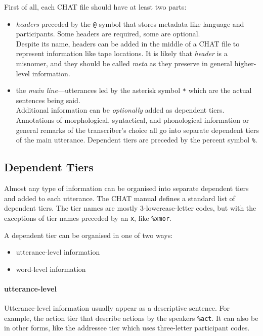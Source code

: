First of all, each CHAT file should have at least two parts:
\begin{itemize}
	\item \emph{headers} preceded by the \texttt{@} symbol that stores metadata like language and participants. Some headers are required, some are optional.\\
	Despite its name, headers can be added in the middle of a CHAT file to represent information like tape locations. It is likely that \emph{header} is a misnomer, and they should be called \emph{meta} as they preserve in general higher-level information.
	\item the \emph{main line}---utterances led by the asterisk symbol \texttt{*} which are the actual sentences being said.\\
	Additional information can be \emph{optionally} added as dependent tiers. Annotations of morphological, syntactical, and phonological information or general remarks of the transcriber's choice all go into separate dependent tiers of the main utterance. Dependent tiers are preceded by the percent symbol \texttt{\%}.
\end{itemize}

\subsection{Dependent Tiers}
Almost any type of information can be organised into separate dependent tiers and added to each utterance. The CHAT manual defines a standard list of dependent tiers. The tier names are mostly 3-lowercase-letter codes, but with the exceptions of tier names preceded by an \texttt{x}, like \texttt{\%xmor}.

A dependent tier can be organised in one of two ways:
\begin{itemize}
	\item utterance-level information
	\item word-level information
\end{itemize}

\paragraph{utterance-level}
Utterance-level information usually appear as a descriptive sentence. For example, the action tier that describe actions by the speakers \texttt{\%act}. It can also be in other forms, like the addressee tier which uses three-letter participant codes.

